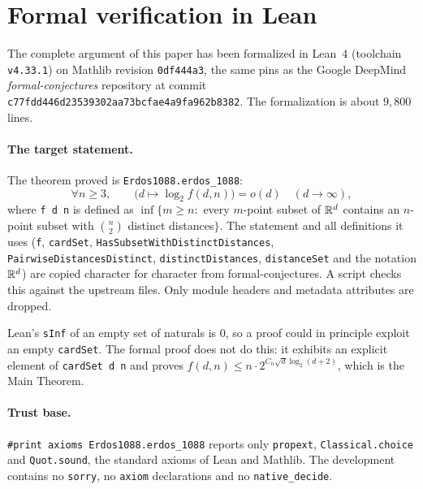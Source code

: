 \section{Formal verification in Lean}\label{sec:lean}
\begin{sloppypar}

The complete argument of this paper has been formalized in Lean~4 (toolchain \texttt{v4.33.1}) on Mathlib revision
\texttt{0df444a3}, the same pins as the Google DeepMind \emph{formal-conjectures} repository at commit
\texttt{c77fdd446d23539302aa73bcfae4a9fa962b8382}. The formalization is about $9{,}800$ lines.

\paragraph{The target statement.} The theorem proved is \texttt{Erdos1088.erdos\_1088}:
\[
\forall n\ge 3,\qquad \bigl(d\mapsto \log_2 f(d,n)\bigr) = o(d)\quad (d\to\infty),
\]
where \texttt{f d n} is defined as $\inf\{m\ge n:$ every $m$-point subset of $\mathbb{R}^d$ contains an $n$-point subset
with $\binom n2$ distinct distances$\}$. The statement and all definitions it uses (\texttt{f}, \texttt{cardSet},
\texttt{HasSubsetWithDistinctDistances}, \texttt{PairwiseDistancesDistinct}, \texttt{distinctDistances},
\texttt{distanceSet} and the notation $\mathbb{R}^d$) are copied character for character from formal-conjectures. A script
checks this against the upstream files. Only module headers and metadata attributes are dropped.

Lean's \texttt{sInf} of an empty set of naturals is $0$, so a proof could in principle exploit an empty
\texttt{cardSet}. The formal proof does not do this: it exhibits an explicit element of \texttt{cardSet d n} and
proves $f(d,n)\le n\cdot 2^{C_n\sqrt d\log_2(d+2)}$, which is the Main Theorem.

\paragraph{Trust base.} \texttt{\#print axioms Erdos1088.erdos\_1088} reports only \texttt{propext},
\texttt{Classical.choice} and \texttt{Quot.sound}, the standard axioms of Lean and Mathlib. The development
contains no \texttt{sorry}, no \texttt{axiom} declarations and no \texttt{native\_decide}.


\end{sloppypar}
